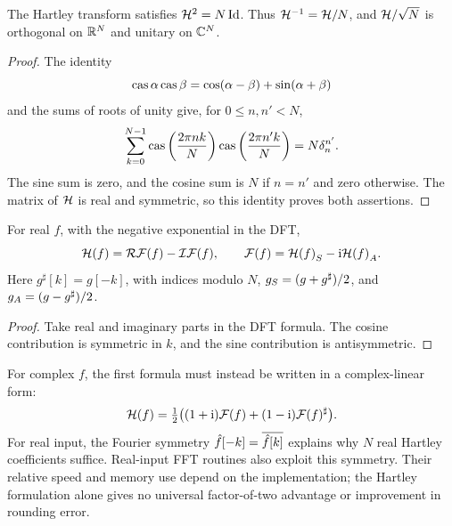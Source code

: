 
\begin{prop}[Inversion]
\label{prop-ptes-transfo-hartley}
The Hartley transform satisfies $\mathcal{H}^2=N\operatorname{Id}$. Thus
$\mathcal{H}^{-1}=\mathcal{H}/N$, and $\mathcal{H}/\sqrt N$ is orthogonal on $\mathbb{R}^N$
and unitary on $\mathbb{C}^N$.
\end{prop}
\begin{proof}
The identity
\begin{equation}
\label{eqn-proof-inversion-hartley}
 \operatorname{cas}\alpha\operatorname{cas}\beta=\cos(\alpha-\beta)+\sin(\alpha+\beta)
\end{equation}
and the sums of roots of unity give, for $0\leq n,n'<N$,
\begin{equation}
\label{eq-orthogonalite-cas}
 \sum_{k=0}^{N-1}\operatorname{cas}\left(\frac{2\pi nk}{N}\right)
 \operatorname{cas}\left(\frac{2\pi n'k}{N}\right)=N\delta_n^{n'}.
\end{equation}
The sine sum is zero, and the cosine sum is $N$ if $n=n'$ and zero
otherwise. The matrix of $\mathcal{H}$ is real and symmetric, so this identity
proves both assertions.
\end{proof}


\begin{prop}
For real $f$, with the negative exponential in the DFT,
\begin{equation}
\label{eq-relation-tfd-hartley}
 \mathcal{H}(f)=\mathcal{R}\mathcal{F}(f)-\mathcal{I}\mathcal{F}(f),\qquad
 \mathcal{F}(f)={\mathcal{H}(f)}_S-\mathrm{i}{\mathcal{H}(f)}_A.
\end{equation}
Here $g^\sharp[k]=g[-k]$, with indices modulo $N$,
${g}_S=(g+g^\sharp)/2$, and ${g}_A=(g-g^\sharp)/2$.
\end{prop}
\begin{proof}
Take real and imaginary parts in the DFT formula. The cosine contribution
is symmetric in $k$, and the sine contribution is antisymmetric.
\end{proof}
For complex $f$, the first formula must instead be written in a
complex-linear form:
\[
 \mathcal{H}(f)=\tfrac12\bigl((1+\mathrm{i})\mathcal{F}(f)
                    +(1-\mathrm{i})\mathcal{F}(f)^\sharp\bigr).
\]
For real input, the Fourier symmetry $\hat{f}[-k]=\overline{\hat{f}[k]}$
explains why $N$ real Hartley coefficients suffice. Real-input FFT routines
also exploit this symmetry. Their relative speed and memory use depend on
the implementation; the Hartley formulation alone gives no universal
factor-of-two advantage or improvement in rounding error.

